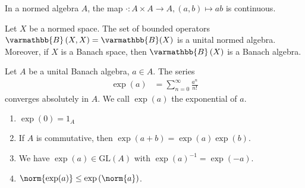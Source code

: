 \documentclass[10pt]{mypackage}
\renewcommand*{\mathbb}[1]{\varmathbb{#1}}
\newcommand{\B}{\mathbb{B}}
\begin{document}
\begin{lemma}
  In a normed algebra $A$, the map $\cdot: A\times A \rightarrow A,(a,b)\mapsto ab$ is continuous.
\end{lemma}
\begin{proposition}
  Let $X$ be a normed space. The set of bounded operators $\B\left(X,X\right) = \B(X)$ is a unital normed algebra. Moreover, if $X$ is a Banach space, then $\B\left(X\right)$ is a Banach algebra.
\end{proposition}
\begin{proposition}
  Let $A$ be a unital Banach algebra, $a\in A$. The series
  \begin{align*}
    \exp(a) &= \sum_{n=0}^{\infty}\frac{a^n}{n!}
  \end{align*}
  converges absolutely in $A$. We call $\exp(a) $ the exponential of $a$.
  \begin{enumerate}[(1)]
    \item $\exp(0) = 1_A$
    \item If $A$ is commutative, then $\exp(a+b) = \exp(a)\exp(b)$.
    \item We have $\exp(a)\in \text{GL}(A)$ with $\exp(a)^{-1} = \exp(-a)$.
    \item $\norm{\exp(a)}\leq \exp\left(\norm{a}\right)$.
  \end{enumerate}
\end{proposition}
\end{document}
